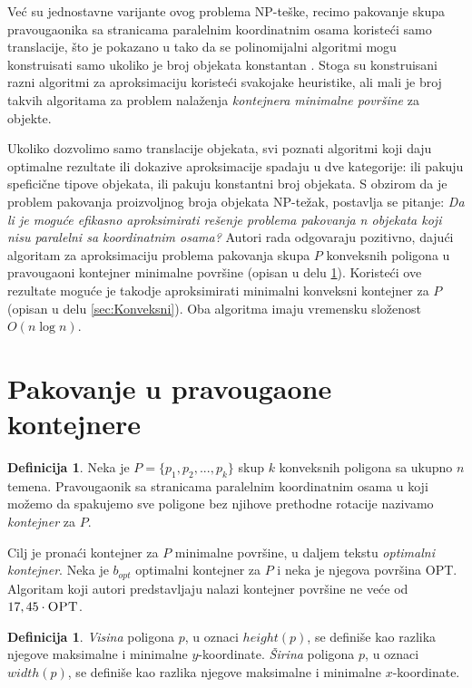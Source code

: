 \documentclass[a4paper]{article}
\theoremstyle{plain}
\theoremstyle{definition}
\newtheorem{defn}[thm]{Definicija} %
\begin{document}
Ve\'c{} su jednostavne varijante ovog problema NP-te\v{s}ke, recimo pakovanje skupa pravougaonika sa stranicama paralelnim koordinatnim osama koriste\'c{}i samo translacije, \v{s}to je pokazano u \cite{OptimalPackingInPlane} tako da se polinomijalni algoritmi mogu konstruisati samo ukoliko je broj objekata konstantan \cite{BuildingThreeConvexPolygons, AligningTwoConvexFigures}. Stoga su konstruisani razni algoritmi za aproksimaciju koriste\'c{}i svakojake heuristike, ali mali je broj takvih algoritama za problem nala\v{z}enja \emph{kontejnera minimalne povr\v{s}ine} za objekte. 

Ukoliko dozvolimo samo translacije objekata, svi poznati algoritmi koji daju optimalne rezultate ili dokazive aproksimacije spadaju u dve kategorije: ili pakuju spefici\v{c}ne tipove objekata, ili pakuju konstantni broj objekata. S obzirom da je problem pakovanja proizvoljnog broja objekata NP-te\v{z}ak, postavlja se pitanje: \emph{Da li je mogu\'c{}e efikasno aproksimirati re\v{s}enje problema pakovanja n objekata koji nisu paralelni sa koordinatnim osama?} Autori rada odgovaraju pozitivno, daju\'c{}i algoritam za aproksimaciju problema pakovanja skupa $P$ konveksnih poligona u pravougaoni kontejner minimalne povr\v{s}ine (opisan u delu \ref{sec:Pravougaoni}). Koriste\'c{}i ove rezultate mogu\'c{}e je takodje aproksimirati minimalni konveksni kontejner za $P$ (opisan u delu \ref{sec:Konveksni}). Oba algoritma imaju vremensku slo\v{z}enost $O(n\log{}n)$.


\section{Pakovanje u pravougaone kontejnere}
\label{sec:Pravougaoni}

\begin{defn}
    Neka je $P = \{ p_{1}, p_{2}, ... , p_{k} \}$ skup $k$ konveksnih poligona sa ukupno $n$ temena. Pravougaonik sa stranicama paralelnim koordinatnim osama u koji mo\v{z}emo da spakujemo sve poligone bez njihove prethodne rotacije nazivamo \emph{kontejner} za $P$.    
\end{defn}

Cilj je prona\'c{}i kontejner za $P$ minimalne povr\v{s}ine, u daljem tekstu \emph{optimalni kontejner}. Neka je $b_{opt}$ optimalni kontejner za $P$ i neka je njegova povr\v{s}ina \textsc{OPT}. Algoritam koji autori predstavljaju nalazi kontejner povr\v{s}ine ne ve\'c{}e od $17,45 \cdot \textsc{OPT}$.

\begin{defn}
    \emph{Visina} poligona $p$, u oznaci \emph{$height(p)$}, se defini\v{s}e kao razlika njegove maksimalne i minimalne $y$-koordinate. \emph{\v{S}irina} poligona $p$, u oznaci \emph{$width(p)$}, se defini\v{s}e kao razlika njegove maksimalne i minimalne $x$-koordinate.
\end{defn}
\end{document}
